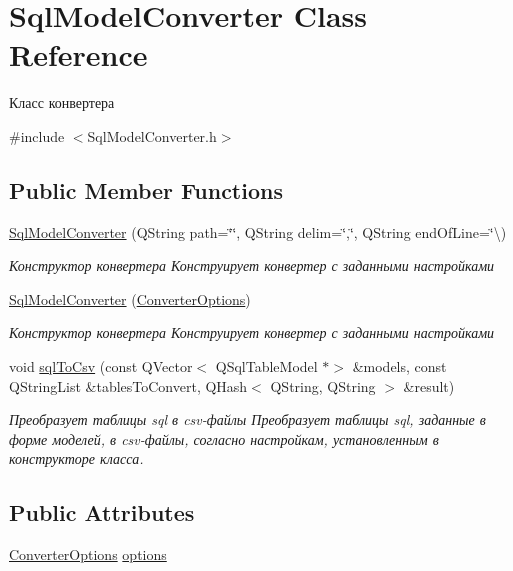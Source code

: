 \hypertarget{class_sql_model_converter}{}\section{Sql\+Model\+Converter Class Reference}
\label{class_sql_model_converter}


Класс конвертера  




{\ttfamily \#include $<$Sql\+Model\+Converter.\+h$>$}

\subsection*{Public Member Functions}
\begin{DoxyCompactItemize}
\item 
\hyperlink{class_sql_model_converter_af7cf0d9772323b9707697f0ab4fc4e77}{Sql\+Model\+Converter} (Q\+String path=\char`\"{}\char`\"{}, Q\+String delim=\char`\"{},\char`\"{}, Q\+String end\+Of\+Line=\char`\"{}\textbackslash{})
\begin{DoxyCompactList}\small\item\em Конструктор конвертера Конструирует конвертер с заданными настройками \end{DoxyCompactList}\item 
\hyperlink{class_sql_model_converter_a9d2feafdb9c7568370f2c02bb7e5e64f}{Sql\+Model\+Converter} (\hyperlink{class_converter_options}{Converter\+Options})
\begin{DoxyCompactList}\small\item\em Конструктор конвертера Конструирует конвертер с заданными настройками \end{DoxyCompactList}\item 
void \hyperlink{class_sql_model_converter_a9cff9f1e0a7dfa36d0a34a8a3188f1ea}{sql\+To\+Csv} (const Q\+Vector$<$ Q\+Sql\+Table\+Model $\ast$$>$ \&models, const Q\+String\+List \&tables\+To\+Convert, Q\+Hash$<$ Q\+String, Q\+String $>$ \&result)
\begin{DoxyCompactList}\small\item\em Преобразует таблицы sql в csv-\/файлы Преобразует таблицы sql, заданные в форме моделей, в csv-\/файлы, согласно настройкам, установленным в конструкторе класса. \end{DoxyCompactList}\end{DoxyCompactItemize}
\subsection*{Public Attributes}
\begin{DoxyCompactItemize}
\item 
\hyperlink{class_converter_options}{Converter\+Options} \hyperlink{class_sql_model_converter_a562f55118cd1924c249796b6e183acbd}{options}
\end{DoxyCompactItemize}


